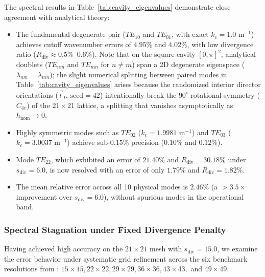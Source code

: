 \documentclass[preprint,12pt]{elsarticle}
\begin{document}
The spectral results in Table~\ref{tab:cavity_eigenvalues} demonstrate close agreement with analytical theory:
\begin{itemize}
    \item The fundamental degenerate pair ($TE_{10}$ and $TE_{01}$, with exact $k_c = 1.0\text{ m}^{-1}$) achieves cutoff wavenumber errors of $4.95\%$ and $4.02\%$, with low divergence ratio ($R_{\mathrm{div}} \approx 0.5\%\text{--}0.6\%$). Note that on the square cavity $[0, \pi]^2$, analytical doublets ($TE_{nm}$ and $TE_{mn}$ for $n \ne m$) span a 2D degenerate eigenspace ($\lambda_{nm} = \lambda_{mn}$); the slight numerical splitting between paired modes in Table~\ref{tab:cavity_eigenvalues} arises because the randomized interior director orientations ($\vec{t}_I$, $\text{seed}=42$) intentionally break the $90^\circ$ rotational symmetry ($C_{4v}$) of the $21\times 21$ lattice, a splitting that vanishes asymptotically as $h_{\mathrm{nom}} \to 0$.
    \item Highly symmetric modes such as $TE_{02}$ ($k_c = 1.9981\text{ m}^{-1}$) and $TE_{03}$ ($k_c = 3.0037\text{ m}^{-1}$) achieve sub-$0.15\%$ precision ($0.10\%$ and $0.12\%$).
    \item Mode $TE_{22}$, which exhibited an error of $21.40\%$ and $R_{\mathrm{div}} = 30.18\%$ under $s_{\mathrm{div}} = 6.0$, is now resolved with an error of only $\mathbf{1.79\%}$ and $R_{\mathrm{div}} = 1.82\%$.
    \item The mean relative error across all 10 physical modes is $\mathbf{2.46\%}$ (a $>3.5\times$ improvement over $s_{\mathrm{div}} = 6.0$), without spurious modes in the operational band.
\end{itemize}

\subsubsection{Spectral Stagnation under Fixed Divergence Penalty}
\label{subsubsec:stagnation_fixed_sdiv}

Having achieved high accuracy on the $21 \times 21$ mesh with $s_{\mathrm{div}} = 15.0$, we examine the error behavior under systematic grid refinement across the six benchmark resolutions from \cite{stable_vnmm2d_2026}: $15 \times 15, 22 \times 22, 29 \times 29, 36 \times 36, 43 \times 43,$ and $49 \times 49$.
\end{document}
